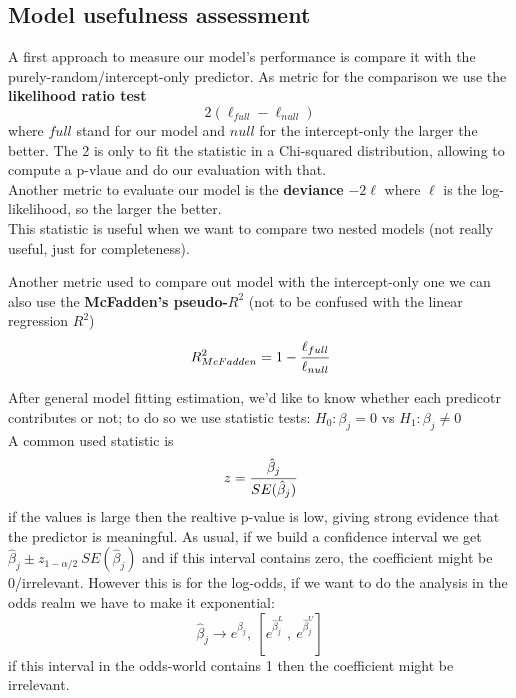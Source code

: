 \vspace{0.3cm}
\subsection{Model usefulness assessment}
A first approach to measure our model's performance is compare it with the purely-random/intercept-only predictor. As metric for the comparison we use the \textbf{likelihood ratio test} 
$$
2(\ell_{full}-\ell_{null})
$$ 
where $full$ stand for our model and $null$ for the intercept-only \arrow the larger the better. The 2 is only to fit the statistic in a Chi-squared distribution, allowing to compute a p-vlaue and do our evaluation with that.\\

\vspace{0.5cm}
Another metric to evaluate our model is the \textbf{deviance} $-2\ell$ where $\ell$ is the log-likelihood, so the larger the better.\\
This statistic is useful when we want to compare two nested models (not really useful, just for completeness).

\vspace{0.5cm}
Another metric used to compare out model with the intercept-only one we can also use the \textbf{McFadden's pseudo-$R^2$} (not to be confused with the linear regression $R^2$)
$$
R^2_{McFadden}  = 1 -\cfrac{\ell_{full}}{\ell_{null}}
$$

After general model fitting estimation, we'd like to know whether each predicotr contributes or not; to do so we use statistic tests: $H_0:\beta_j=0$ vs $H_1:\beta_j\neq0$\\
A common used statistic is
$$
z=\cfrac{\hat{\beta}_j}{SE(\hat{\beta}_j)}
$$
if the values is large then the realtive p-value is low, giving strong evidence that the predictor is meaningful. As usual, if we build a confidence interval we get $\hat{\beta}_j \pm z_{1-\alpha/2}\ SE(\hat{\beta}_j)$ and if this interval contains zero, the coefficient might be 0/irrelevant.
However this is for the log-odds, if we want to do the analysis in the odds realm we have to make it exponential:
$$
\hat{\beta}_j \rightarrow e^{\hat{\beta}_j},\ \left[e^{\hat{\beta}_j^L}\ ,\ e^{\hat{\beta}_j^U} \right]
$$
if this interval in the odds-world contains 1 then the coefficient might be irrelevant.

